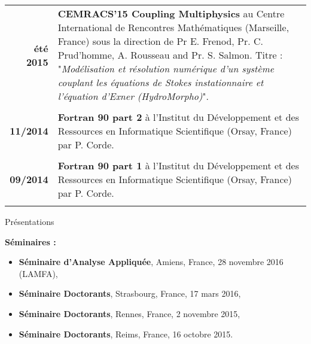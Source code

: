 \documentclass[10pt,a4paper]{report}
\begin{document}
\begin{center}
\begin{tabular}{r p{12cm}}
\textbf{été 2015} & \textbf{CEMRACS'15 Coupling Multiphysics} au Centre International de Rencontres Mathématiques (Marseille, France) sous la direction de Pr E. Frenod, Pr. C. Prud'homme, A. Rousseau and Pr. S. Salmon.\newline
Titre : "\textit{Modélisation et résolution numérique d'un système couplant les équations de Stokes instationnaire et l'équation d'Exner (HydroMorpho)}".\\

& \\

\textbf{11/2014} & \textbf{Fortran 90 part 2} à l'Institut du Développement et des Ressources en Informatique Scientifique (Orsay, France) par P. Corde.\\

& \\

\textbf{09/2014} & \textbf{Fortran 90 part 1} à l'Institut du Développement et des Ressources en Informatique Scientifique (Orsay, France) par P. Corde.\\

& \\

\end{tabular}
\end{center}


\vspace{1cm}
\noindent
{\selectfont
\begin{Large}
Présentations
\end{Large}
\hrulefill
}


\vspace{0.4cm}
\noindent
{\selectfont
\textbf{Séminaires :}
}

\begin{itemize}
\item \textbf{Séminaire d'Analyse Appliquée}, Amiens, France, 28 novembre 2016 (LAMFA),
\item \textbf{Séminaire Doctorants}, Strasbourg, France, 17 mars 2016,
\item \textbf{Séminaire Doctorants}, Rennes, France, 2 novembre 2015,
\item \textbf{Séminaire Doctorants}, Reims, France, 16 octobre 2015.
\end{itemize}
\end{document}
